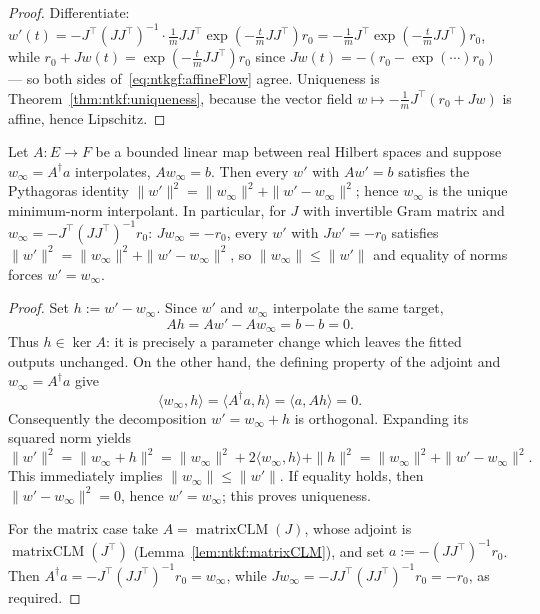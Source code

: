 \begin{proof}
  \leanok
Differentiate: $w'(t)=-J^\top(JJ^\top)^{-1}\cdot\frac1mJJ^\top\exp(-\frac tmJJ^\top)r_0=-\frac1mJ^\top\exp(-\frac tmJJ^\top)r_0$, while $r_0+Jw(t)=\exp(-\frac tmJJ^\top)r_0$ since $J w(t)=-(r_0-\exp(\cdots)r_0)$ ---
so both sides of~\eqref{eq:ntkgf:affineFlow} agree. Uniqueness is Theorem~\ref{thm:ntkf:uniqueness}, because the vector field $w\mapsto-\frac1mJ^\top(r_0+Jw)$ is affine, hence Lipschitz.
\end{proof}

\begin{theorem}\label{thm:ntkgf:minNorm}
  \leanok
Let $A:E\to F$ be a bounded linear map between real Hilbert spaces and suppose $w_\infty=A^\dagger a$ interpolates, $Aw_\infty=b$. Then every $w'$ with $Aw'=b$ satisfies the Pythagoras identity
$\|w'\|^2=\|w_\infty\|^2+\|w'-w_\infty\|^2$; hence $w_\infty$ is the unique minimum-norm interpolant.
In particular, for $J$ with invertible Gram matrix and $w_\infty=-J^\top(JJ^\top)^{-1}r_0$: $Jw_\infty=-r_0$, every $w'$ with $Jw'=-r_0$ satisfies
$\|w'\|^2=\|w_\infty\|^2+\|w'-w_\infty\|^2$, so $\|w_\infty\|\le\|w'\|$ and equality of norms forces $w'=w_\infty$.
\end{theorem}

\begin{proof}
  \leanok
Set $h:=w'-w_\infty$. Since $w'$ and $w_\infty$ interpolate the same target,
\[
  Ah=Aw'-Aw_\infty=b-b=0.
\]
Thus $h\in\ker A$: it is precisely a parameter change which leaves the fitted outputs unchanged. On the other hand,
the defining property of the adjoint and $w_\infty=A^\dagger a$ give
\[
  \langle w_\infty,h\rangle
  =\langle A^\dagger a,h\rangle
  =\langle a,Ah\rangle
  =0.
\]
Consequently the decomposition $w'=w_\infty+h$ is orthogonal. Expanding its squared norm yields
\[
  \|w'\|^2=\|w_\infty+h\|^2
  =\|w_\infty\|^2+2\langle w_\infty,h\rangle+\|h\|^2
  =\|w_\infty\|^2+\|w'-w_\infty\|^2.
\]
This immediately implies $\|w_\infty\|\leq\|w'\|$. If equality holds, then
$\|w'-w_\infty\|^2=0$, hence $w'=w_\infty$; this proves uniqueness.

For the matrix case take $A=\operatorname{matrixCLM}(J)$, whose adjoint is
$\operatorname{matrixCLM}(J^\top)$ (Lemma~\ref{lem:ntkf:matrixCLM}), and set
$a:=-(JJ^\top)^{-1}r_0$. Then $A^\dagger a=-J^\top(JJ^\top)^{-1}r_0=w_\infty$, while
$Jw_\infty=-JJ^\top(JJ^\top)^{-1}r_0=-r_0$, as required.
\end{proof}

